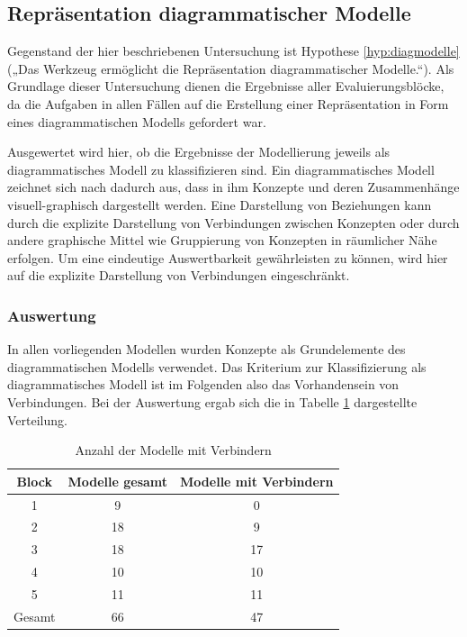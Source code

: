 \subsection{Repräsentation diagrammatischer Modelle} %
\label{sub:repräsentation_diagrammatischer_modelle}

Gegenstand der hier beschriebenen Untersuchung ist Hypothese \ref{hyp:diagmodelle} („Das Werkzeug ermöglicht die Repräsentation diagrammatischer Modelle.“). Als Grundlage dieser Untersuchung dienen die Ergebnisse aller Evaluierungsblöcke, da die Aufgaben in allen Fällen auf die Erstellung einer Repräsentation in Form eines diagrammatischen Modells gefordert war.

Ausgewertet wird hier, ob die Ergebnisse der Modellierung jeweils als diagrammatisches Modell zu klassifizieren sind. Ein diagrammatisches Modell zeichnet sich nach \citep{Larkin87} dadurch aus, dass in ihm Konzepte und deren Zusammenhänge visuell-graphisch dargestellt werden. Eine Darstellung von Beziehungen kann durch die explizite Darstellung von Verbindungen zwischen Konzepten oder durch andere graphische Mittel wie Gruppierung von Konzepten in räumlicher Nähe erfolgen. Um eine eindeutige Auswertbarkeit gewährleisten zu können, wird hier auf die explizite Darstellung von Verbindungen eingeschränkt. 

\subsubsection{Auswertung} %

In allen vorliegenden Modellen wurden Konzepte als Grundelemente des diagrammatischen Modells verwendet. Das Kriterium zur Klassifizierung als diagrammatisches Modell ist im Folgenden also das Vorhandensein von Verbindungen. Bei der Auswertung ergab sich die in Tabelle \ref{tab:modelle_mit_verbindern} dargestellte Verteilung.

\begin{table}[htbp]
	\centering
	\caption{Anzahl der Modelle mit Verbindern}

\begin{tabular}{| c || c | c |}
  \hline
   Block & Modelle gesamt & Modelle mit Verbindern \\ \hline
   1 & 9 & 0 \\ 
   2 & 18 & 9 \\ 
   3 & 18 & 17 \\ 
   4 & 10 & 10 \\ 
   5 & 11 & 11 \\ \hline
   Gesamt & 66 & 47 \\ \hline
\end{tabular}
	\label{tab:modelle_mit_verbindern}
\end{table}

